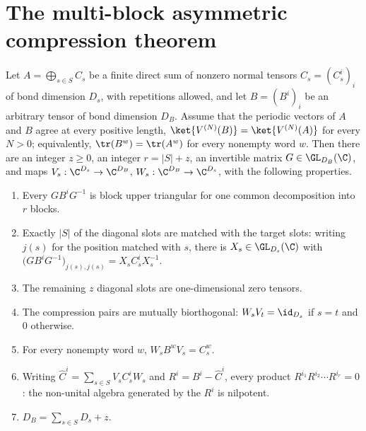 \section{The multi-block asymmetric compression theorem}%
\label{sec:asym_main}

\begin{theorem}
    \label{thm:asym_multiblock}
    \leanok
    Let $A=\bigoplus_{s\in S}C_s$ be a finite direct sum of nonzero normal
    tensors $C_s=(C_s^i)_i$ of bond dimension $D_s$, with repetitions
    allowed, and let $B=(B^i)_i$ be an arbitrary tensor of bond dimension
    $D_B$. Assume that the periodic vectors of $A$ and $B$ agree at every
    positive length,
    $\ket{V^{(N)}(B)}=\ket{V^{(N)}(A)}$ for every $N>0$; equivalently,
    $\tr(B^w)=\tr(A^w)$ for every nonempty word $w$. Then there are an
    integer $z\geq0$, an integer $r=|S|+z$, an invertible matrix
    $G\in\GL_{D_B}(\C)$, and maps $V_s:\C^{D_s}\to\C^{D_B}$,
    $W_s:\C^{D_B}\to\C^{D_s}$, with the following properties.
    \begin{enumerate}
        \item[(i)] Every $GB^iG^{-1}$ is block upper triangular for one common
              decomposition into $r$ blocks.
        \item[(ii)] Exactly $|S|$ of the diagonal slots are matched with the
              target slots: writing $j(s)$ for the position matched with $s$,
              there is $X_s\in\GL_{D_s}(\C)$ with
              $\bigl(GB^iG^{-1}\bigr)_{j(s),j(s)}=X_sC_s^iX_s^{-1}$.
        \item[(iii)] The remaining $z$ diagonal slots are one-dimensional zero
              tensors.
        \item[(iv)] The compression pairs are mutually biorthogonal: $W_sV_t=
                  \id_{D_s}$ if $s=t$ and $0$ otherwise.
        \item[(v)] For every nonempty word $w$, $W_sB^wV_s=C_s^w$.
        \item[(vi)] Writing $\widehat C^i=\sum_{s\in S}V_sC_s^iW_s$ and
              $R^i=B^i-\widehat C^i$, every product
              $R^{i_1}R^{i_2}\cdots R^{i_r}=0$: the non-unital algebra generated
              by the $R^i$ is nilpotent.
        \item[(vii)] $D_B=\sum_{s\in S}D_s+z$.
    \end{enumerate}
\end{theorem}

